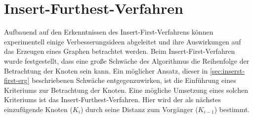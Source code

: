 \section{Insert-Furthest-Verfahren} \label{sec:insert-furthest-verfahren}

Aufbauend auf den Erkenntnissen des Insert-First-Verfahrens können experimentell einige Verbesserungsideen abgeleitet und ihre Auswirkungen auf das Erzeugen eines Graphen betrachtet werden.
Beim Insert-First-Verfahren wurde festgestellt, dass eine große Schwäche des Algorithmus die Reihenfolge der Betrachtung der Knoten sein kann.
Ein möglicher Ansatz, dieser in \vref{sec:inserst-first-erg} beschriebenen Schwäche entgegenzuwirken, ist die Einführung eines Kriteriums zur Betrachtung der Knoten.
Eine mögliche Umsetzung eines solchen Kriteriums ist das Insert-Furthest-Verfahren. 
Hier wird der als nächstes einzufügende Knoten ($K_i$) durch seine Distanz zum Vorgänger ($K_{i-1}$) bestimmt.

